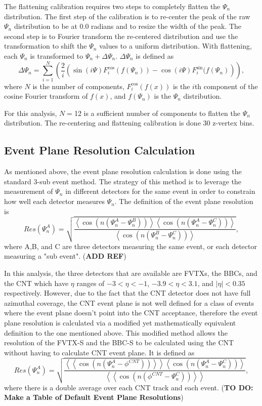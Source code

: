 The flattening calibration requires two steps to completely flatten the $\Psi_n$ distribution. The first step of the calibration is to re-center the peak of the raw $\Psi_n$ distribution to be at 
0.0 radians and to resize the width of the peak. The second step is to Fourier transform the re-centered distribution and use the transformation to shift the $\Psi_n$ values to a uniform distribution. With flattening, each $\Psi_n$ is transformed to $\Psi_n + \Delta\Psi_n$. $\Delta\Psi_n$ is defined as
\begin{equation}
\Delta\Psi_n = \sum^{N}_{i=1}\left(\frac{2}{i}\left(\sin(i \Psi)F^{\cos}_{i}(f(\Psi_n))-\cos(i \Psi)F^{\sin}_{i}(f(\Psi_n)\right)\right),
\label{eq:deltapsi}
\end{equation}
where $N$ is the number of components, $F^{\cos}_{i}(f(x))$ is the $i$th component of the cosine Fourier transform of $f(x)$, and $f(\Psi_n)$ is the $\Psi_n$ distribution.

For this analysis, $N=$12 is a sufficient number of components to flatten the $\Psi_n$ distribution. The re-centering and flattening calibration is done 30 z-vertex bins.

\subsection{Event Plane Resolution Calculation}
As mentioned above, the event plane resolution calculation is done using the standard 3-sub event method. The strategy of this method is to leverage the measurement of $\Psi_n$ in
different detectors for the same event in order to constrain how well each detector measures $\Psi_n$. The definition of the event plane resolution is
\begin{equation}
Res(\Psi_n^A) = \sqrt{\frac{\left<\cos(n(\Psi_n^A - \Psi_n^B))\right>\left<\cos(n(\Psi_n^A - \Psi_n^C))\right>}{\left<\cos(n(\Psi_n^B - \Psi_n^C))\right>}},
\end{equation}
where A,B, and C are three detectors measuring the same event, or each detector measuring a "sub event". (\textbf{ADD REF})

In this analysis, the three detectors that are available are FVTXs, the BBCs, and the CNT which have $\eta$ ranges of $-3 <\eta < -1$, $-3.9 < \eta < 3.1$, and $|\eta| < 0.35$ respectively. 
However, due to the fact that the CNT detector does not have full azimuthal coverage, the CNT event plane is not well defined for a class of events where the event plane doesn't point into the CNT acceptance, therefore the event plane resolution is calculated via a modified yet mathematically equivalent definition to the one mentioned above. This modified method allows the resolution of the FVTX-S and the BBC-S to be calculated using the CNT without having to calculate CNT event plane. It is defined as
\begin{equation}
Res(\Psi_n^A) = \sqrt{\frac{\left<\left<\cos(n(\Psi_n^A - \phi^{CNT}))\right>\right>\left<\cos(n(\Psi_n^A - \Psi_n^C))\right>}{\left<\left<\cos(n(\phi^{CNT} - \Psi_n^C))\right>\right>}},
\end{equation}
where there is a double average over each CNT track and each event.
(\textbf{TO DO: Make a Table of Default Event Plane Resolutions})

